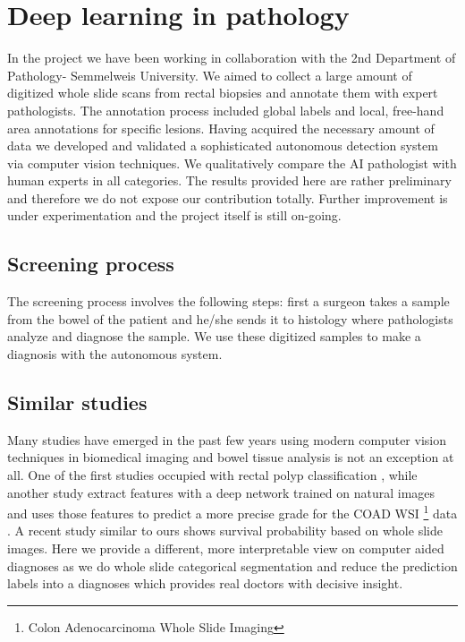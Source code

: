 \documentclass[a4paper,12pt]{article}
\begin{document}
\newpage

\section{Deep learning in pathology}

\vspace{7mm}

\par In the project we have been working in collaboration with the 2nd Department of Pathology- Semmelweis University. We aimed to collect a large amount of digitized whole slide scans from rectal biopsies and annotate them with expert pathologists. The annotation process included global labels and local, free-hand area annotations for specific lesions. Having acquired the necessary amount of data we developed and validated a sophisticated autonomous detection system via computer vision techniques. We qualitatively compare the AI pathologist with human experts in all categories. The results provided here are rather preliminary and therefore we do not expose our contribution totally. Further improvement is under experimentation and the project itself is still on-going.

\vspace{4mm}

\subsection{Screening process}

\vspace{4mm}

\par The screening process involves the following steps: first a surgeon takes a sample from the bowel of the patient and he/she sends it to histology where pathologists analyze and diagnose the sample. We use these digitized samples to make a diagnosis with the autonomous system.

\vspace{4mm}

\subsection{Similar studies}

\vspace{4mm}

\par Many studies have emerged in the past few years using modern computer vision techniques in biomedical imaging and bowel tissue analysis is not an exception at all. One of the first studies occupied with rectal polyp classification \cite{korbar2017deep}, while another study extract features with a deep network trained on natural images and uses those features to predict a more precise grade for the COAD WSI \footnote{Colon Adenocarcinoma Whole Slide Imaging} data \cite{bychkov2018deep}. A recent study similar to ours shows \cite{skrede2020deep} survival probability based on whole slide images. Here we provide a different, more interpretable view on computer aided diagnoses as we do whole slide categorical segmentation and reduce the prediction labels into a diagnoses which provides real doctors with decisive insight.
\end{document}
